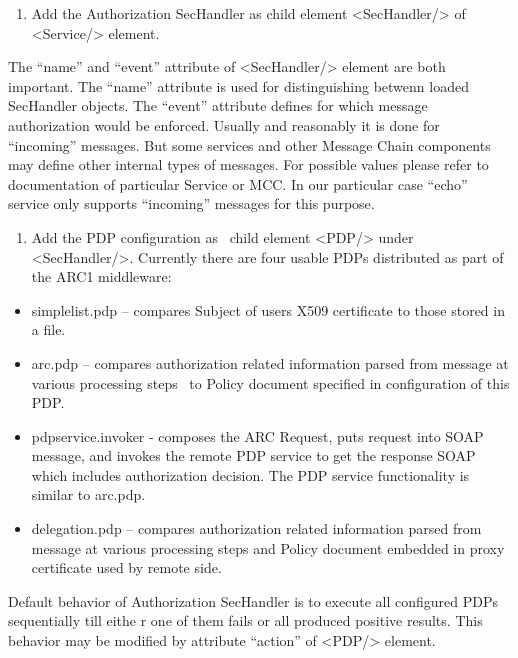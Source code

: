 \documentclass{article}
\newcounter{saveenum}
\newcommand\liststyleWWviiiNumxi{%
\renewcommand\theenumi{\arabic{enumi}}
\renewcommand\theenumii{\arabic{enumii}}
\renewcommand\theenumiii{\arabic{enumiii}}
\renewcommand\theenumiv{\arabic{enumiv}}
\renewcommand\labelenumi{\theenumi.}
\renewcommand\labelenumii{\theenumii.}
\renewcommand\labelenumiii{\theenumiii.}
\renewcommand\labelenumiv{\theenumiv.}
}
\newcommand\liststyleWWviiiNumxii{%
\renewcommand\labelitemi{[F0B7?]}
\renewcommand\labelitemii{[F0B7?]}
\renewcommand\labelitemiii{[F0B7?]}
\renewcommand\labelitemiv{[F0B7?]}
}
\begin{document}
\liststyleWWviiiNumxi
\begin{enumerate}
\item {\color{black}
Add the Authorization SecHandler as child element
{\textless}SecHandler/{\textgreater} of
{\textless}Service/{\textgreater} element. }
\end{enumerate}
{\color{black}
The {\textquotedblleft}name{\textquotedblright} and
{\textquotedblleft}event{\textquotedblright} attribute of
{\textless}SecHandler/{\textgreater} element are both important. The
{\textquotedblleft}name{\textquotedblright} attribute is used for
distinguishing betwenn loaded SecHandler objects. The
{\textquotedblleft}event{\textquotedblright} attribute defines for
which message authorization would be enforced. Usually and reasonably
it is done for {\textquotedblleft}incoming{\textquotedblright}
messages. But some services and other Message Chain components may
define other internal types of messages. For possible values please
refer to documentation of particular Service or MCC. In our particular
case {\textquotedblleft}echo{\textquotedblright} service only supports
{\textquotedblleft}incoming{\textquotedblright} messages for this
purpose.}

\liststyleWWviiiNumxi
\setcounter{saveenum}{\value{enumi}}
\begin{enumerate}
\setcounter{enumi}{\value{saveenum}}
\item {\color{black}
Add the PDP configuration as \ child element
{\textless}PDP/{\textgreater} under
{\textless}SecHandler/{\textgreater}. Currently there are four usable
PDPs distributed as part of the ARC1 middleware:}
\end{enumerate}
\liststyleWWviiiNumxii
\begin{itemize}
\item {\color{black}
simplelist.pdp -- compares Subject of user{\textquotesingle}s X509
certificate to those stored in a file.}
\item {\color{black}
arc.pdp -- compares authorization related information parsed from
message at various processing steps \ to Policy document specified in
configuration of this PDP.}
\item {\color{black}
pdpservice.invoker - composes the ARC Request, puts request into SOAP
message, and invokes the remote PDP service to get the response SOAP
which includes authorization decision. The PDP service functionality is
similar to arc.pdp.}
\item {\color{black}
delegation.pdp -- compares authorization related information parsed from
message at various processing steps and Policy document embedded in
proxy certificate used by remote side.}
\end{itemize}
{\color{black}
Default behavior of Authorization SecHandler is to execute all
configured PDPs sequentially till eithe r one of them fails or all
produced positive results. This behavior may be modified by attribute
{\textquotedblleft}action{\textquotedblright} of
{\textless}PDP/{\textgreater} element.}
\end{document}
